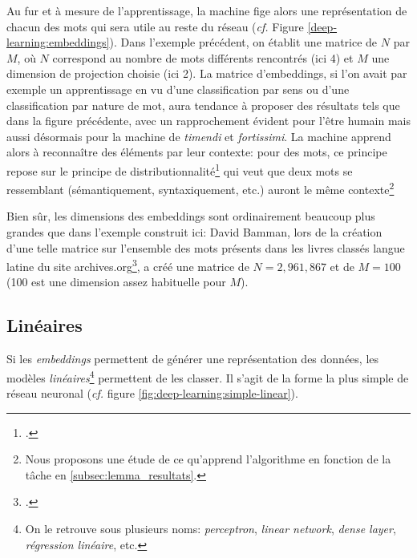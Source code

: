 Au fur et à mesure de l'apprentissage, la machine fige alors une représentation de chacun des mots qui sera utile au reste du réseau (\textit{cf.} Figure \ref{deep-learning:embeddings}). Dans l'exemple précédent, on établit une matrice de $N$ par $M$, où $N$ correspond au nombre de mots différents rencontrés (ici 4) et $M$ une dimension de projection choisie (ici 2). La matrice d'embeddings, si l'on avait par exemple un apprentissage en vu d'une classification par sens ou d'une classification par nature de mot, aura tendance à proposer des résultats tels que dans la figure précédente, avec un rapprochement évident pour l'être humain mais aussi désormais pour la machine de \textit{timendi} et \textit{fortissimi}. La machine apprend alors à reconnaître des éléments par leur contexte: pour des mots, ce principe repose sur le principe de distributionnalité\footcite{firth_papers_1957} qui veut que deux mots se ressemblant (sémantiquement, syntaxiquement, etc.) auront le même contexte\footnote{Nous proposons une étude de ce qu'apprend l'algorithme en fonction de la tâche en \ref{subsec:lemma_resultats}.}





Bien sûr, les dimensions des embeddings sont ordinairement beaucoup plus grandes que dans l'exemple construit ici: David Bamman, lors de la création d'une telle matrice sur l'ensemble des mots présents dans les livres classés langue latine du site archives.org\footcite{bamman_11k_2012}, a créé une matrice de $N=2,961,867$ et de $M=100$ (100 est une dimension assez habituelle pour $M$). 

\subsection{Linéaires}

Si les \textit{embeddings} permettent de générer une représentation des données, les modèles \textit{linéaires}\footnote{On le retrouve sous plusieurs noms: \textit{perceptron}, \textit{linear network}, \textit{dense layer}, \textit{régression linéaire}, etc.} permettent de les classer. Il s'agit de la forme la plus simple de réseau neuronal (\textit{cf.} figure \ref{fig:deep-learning:simple-linear}). 

